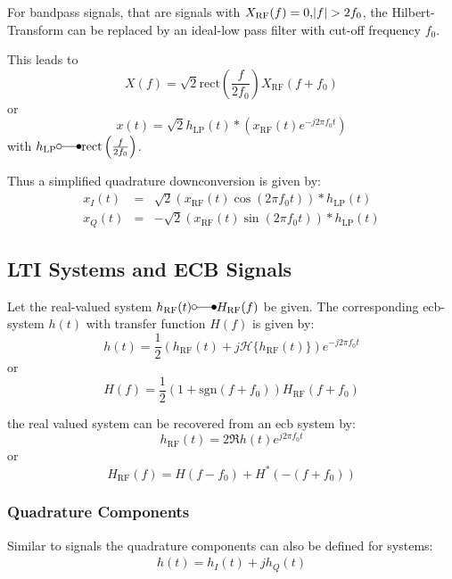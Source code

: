 For bandpass signals, that are signals with $X_\text{RF}(f)=0, \abs{f} > 2 f_0$,
the Hilbert-Transform can be replaced by an ideal-low pass filter with cut-off frequency $f_0$.

This leads to
\begin{equation}
    X(f) = \sqrt{2} \text{rect}\left(\frac{f}{2 f_0}\right) X_\text{RF}(f+f_0)
\end{equation}
or
\begin{equation}
    x(t) = \sqrt{2} h_\text{LP}(t) * (x_\text{RF}(t) e^{-j 2 \pi f_0 t})
\end{equation}
with $h_\text{LP} \laplace \text{rect}\left(\frac{f}{2 f_0}\right)$.

Thus a simplified quadrature downconversion is given by:
\begin{eqnarray}
    x_I(t) &=& \sqrt{2} \left(x_\text{RF}(t) \cos(2\pi f_0 t)\right) * h_\text{LP}(t) \\
    x_Q(t) &=& -\sqrt{2} \left(x_\text{RF}(t) \sin(2\pi f_0 t)\right) * h_\text{LP}(t)
\end{eqnarray}

\subsection{LTI Systems and ECB Signals}
Let the real-valued system $h_\text{RF}(t) \laplace H_\text{RF}(f)$ be given. The 
corresponding \ac{ecb}-system $h(t)$ with transfer function $H(f)$ is given by:
\begin{equation}
    h(t) = \frac{1}{2} \left(h_\text{RF}(t) + j \mathcal{H}\{h_\text{RF}(t)\}\right) e^{-j 2 \pi f_0 t}
\end{equation}
or
\begin{equation}
    H(f) = \frac{1}{2} \left(1 + \text{sgn}(f + f_0)\right) H_\text{RF}(f+f_0)
\end{equation}

the real valued system can be recovered from an \ac{ecb} system by:
\begin{equation}
    h_\text{RF}(t) = 2 \Re{h(t) e^{j 2 \pi f_0 t}}
\end{equation}
or
\begin{equation}
    H_\text{RF}(f) = H(f-f_0) + H^*(-(f+f_0))
\end{equation}

\subsubsection{Quadrature Components}
Similar to signals the quadrature components can also be defined for systems:
\begin{eqnarray}
    h(t) = h_I(t) + j h_Q(t)
\end{eqnarray}


